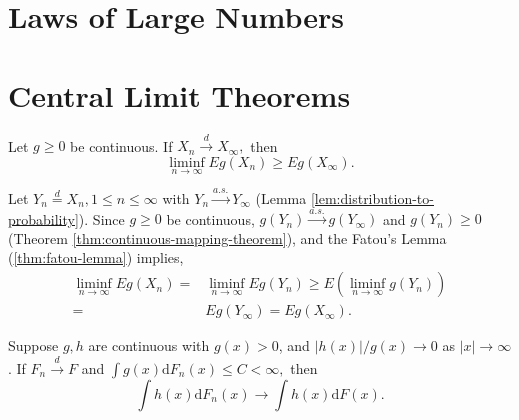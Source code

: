 \section{Laws of Large Numbers}

\section{Central Limit Theorems}

\begin{exercise}
    Let $g\geq 0$ be continuous. If $X_{n}\stackrel{d}{\rightarrow}X_{\infty},$ then
    \begin{equation*}
        \liminf_{n\rightarrow\infty}Eg\left(X_{n}\right)\geq Eg\left(X_{\infty}\right).
    \end{equation*}
    \label{ex:fatou-lemma-distribution}
\end{exercise}

\begin{solution}
    Let $Y_n\stackrel{d}{=}X_n,1\leq n\leq\infty$ with $Y_n\stackrel{a.s.}{\rightarrow}Y_\infty$ (Lemma \ref{lem:distribution-to-probability}).
    Since $g\geq 0$ be continuous, $g(Y_n)\stackrel{a.s.}{\rightarrow}g(Y_\infty)$ and $g(Y_n)\geq 0$ (Theorem \ref{thm:continuous-mapping-theorem}), and the Fatou's Lemma (\ref{thm:fatou-lemma}) implies,
    \begin{equation*}
        \begin{aligned}
            \liminf_{n\rightarrow\infty}Eg(X_n)=&\liminf_{n\rightarrow\infty}Eg(Y_n)\geq E\left(\liminf_{n\rightarrow\infty}g(Y_n)\right)\\
            =&Eg(Y_\infty)=Eg(X_\infty).
        \end{aligned}
    \end{equation*}
\end{solution}

\begin{exercise}
    Suppose $g,h$ are continuous with $g(x)>0$, and $|h(x)|/g(x)\rightarrow 0$ as $|x|\rightarrow\infty$. If $F_{n}\stackrel{d}{\rightarrow}F$ and $\int g(x)\mathrm{d}F_{n}(x)\leq C<\infty,$ then
    \begin{equation*}
        \int h(x)\mathrm{d}F_{n}(x) \rightarrow \int h(x)\mathrm{d}F(x).
    \end{equation*}
\end{exercise}


